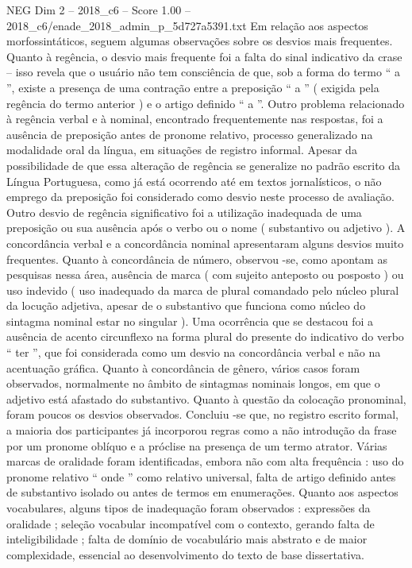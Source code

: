 \begin{textsample}{NEG Dim 2 – 2018\_c6 – Score 1.00 – 2018\_c6/enade\_2018\_admin\_p\_5d727a5391.txt}
Em relação aos aspectos morfossintáticos, seguem algumas observações sobre os desvios mais frequentes.
Quanto à regência, o desvio mais frequente foi a falta do sinal indicativo da crase – isso revela que o usuário não tem consciência de que, sob a forma do termo “ a ”, existe a presença de uma contração entre a preposição “ a ” ( exigida pela regência do termo anterior ) e o artigo definido “ a ”.
Outro problema relacionado à regência verbal e à nominal, encontrado frequentemente nas respostas, foi a ausência de preposição antes de pronome relativo, processo generalizado na modalidade oral da língua, em situações de registro informal.
Apesar da possibilidade de que essa alteração de regência se generalize no padrão escrito da Língua Portuguesa, como já está ocorrendo até em textos jornalísticos, o não emprego da preposição foi considerado como desvio neste processo de avaliação.
Outro desvio de regência significativo foi a utilização inadequada de uma preposição ou sua ausência após o verbo ou o nome ( substantivo ou adjetivo ).
A concordância verbal e a concordância nominal apresentaram alguns desvios muito frequentes.
Quanto à concordância de número, observou -se, como apontam as pesquisas nessa área, ausência de marca ( com sujeito anteposto ou posposto ) ou uso indevido ( uso inadequado da marca de plural comandado pelo núcleo plural da locução adjetiva, apesar de o substantivo que funciona como núcleo do sintagma nominal estar no singular ).
Uma ocorrência que se destacou foi a ausência de acento circunflexo na forma plural do presente do indicativo do verbo “ ter ”, que foi considerada como um desvio na concordância verbal e não na acentuação gráfica.
Quanto à concordância de gênero, vários casos foram observados, normalmente no âmbito de sintagmas nominais longos, em que o adjetivo está afastado do substantivo.
Quanto à questão da colocação pronominal, foram poucos os desvios observados.
Concluiu -se que, no registro escrito formal, a maioria dos participantes já incorporou regras como a não introdução da frase por um pronome oblíquo e a próclise na presença de um termo atrator.
Várias marcas de oralidade foram identificadas, embora não com alta frequência : uso do pronome relativo “ onde ” como relativo universal, falta de artigo definido antes de substantivo isolado ou antes de termos em enumerações.
Quanto aos aspectos vocabulares, alguns tipos de inadequação foram observados : expressões da oralidade ; seleção vocabular incompatível com o contexto, gerando falta de inteligibilidade ; falta de domínio de vocabulário mais abstrato e de maior complexidade, essencial ao desenvolvimento do texto de base dissertativa.

\end{textsample}

